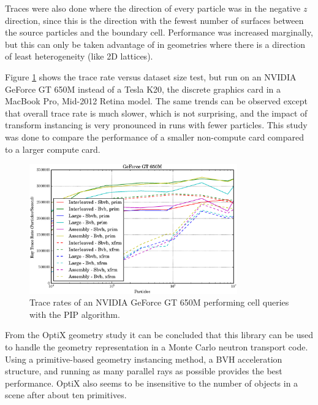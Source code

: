 Traces were also done where the direction of every particle was in the negative $z$ direction, since this is the direction with the fewest number of surfaces between the source particles and the boundary cell.  Performance was increased marginally, but this can only be taken advantage of in geometries where there is a direction of least heterogeneity (like 2D lattices).%

Figure \ref{prelim_optix_G650M} shows the trace rate versus dataset size test, but run on an NVIDIA GeForce GT 650M instead of a Tesla K20, the discrete graphics card in a MacBook Pro, Mid-2012 Retina model.  The same trends can be observed except that overall trace rate is much slower, which is not surprising,%
 and the impact of transform instancing is very pronounced in runs with fewer particles.  This study was done to compare the performance of a smaller non-compute card compared to a larger compute card.

\begin{figure}[h!] 
  \centering
    \includegraphics[width=0.8\textwidth]{graphics/prelim_optix_G650M.eps}
     \caption{Trace rates of an NVIDIA GeForce GT 650M performing cell queries with the PIP algorithm. \label{prelim_optix_G650M} }
\end{figure}%

From the OptiX geometry study it can be concluded that this library can be used to handle the geometry representation in a Monte Carlo neutron transport code.  Using a primitive-based geometry instancing method, a BVH acceleration structure, and running as many parallel rays as possible provides the best performance.  OptiX also seems to be insensitive to the number of objects in a scene after about ten primitives.


